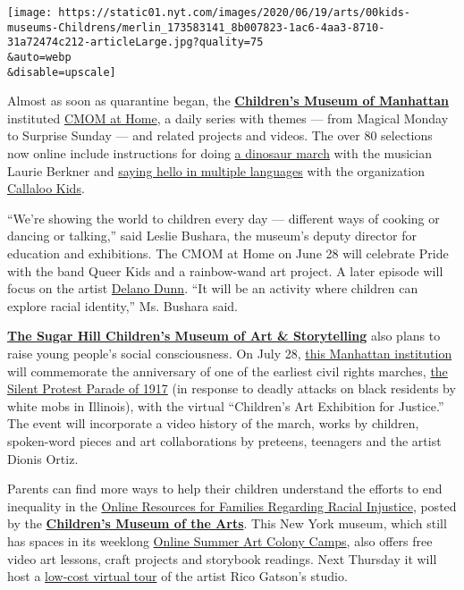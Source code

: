 \texttt{[image: https://static01.nyt.com/images/2020/06/19/arts/00kids-museums-Childrens/merlin\_173583141\_8b007823-1ac6-4aa3-8710-31a72474c212-articleLarge.jpg?quality=75\\\&auto=webp\\\&disable=upscale]}

Almost as soon as quarantine began, the
\textbf{\href{https://cmom.org/}{Children's Museum of Manhattan}}
instituted \href{https://athome.cmom.org/}{CMOM at Home}, a daily series
with themes --- from Magical Monday to Surprise Sunday --- and related
projects and videos. The over 80 selections now online include
instructions for doing
\href{https://athome.cmom.org/join-the-dinosaur-march-with-laurie-berkner/}{a
dinosaur march} with the musician Laurie Berkner and
\href{https://athome.cmom.org/ways-to-say-hello-with-mumu-fresh-and-callaloo-kids/}{saying
hello in multiple languages} with the organization
\href{http://www.callalookids.com/}{Callaloo Kids}.

``We're showing the world to children every day --- different ways of
cooking or dancing or talking,'' said Leslie Bushara, the museum's
deputy director for education and exhibitions. The CMOM at Home on June
28 will celebrate Pride with the band Queer Kids and a rainbow-wand art
project. A later episode will focus on the artist
\href{https://www.youtube.com/watch?v=A90E3QuF0Hw}{Delano Dunn}. ``It
will be an activity where children can explore racial identity,'' Ms.
Bushara said.

\textbf{\href{https://www.sugarhillmuseum.org/}{The Sugar Hill
Children's Museum of Art \& Storytelling}} also plans to raise young
people's social consciousness. On July 28,
\href{https://www.nytimes.com/2018/10/25/arts/design/sugar-hill-museum-art-to-new-yorks-youngest.html}{this
Manhattan institution} will commemorate the anniversary of one of the
earliest civil rights marches,
\href{https://naacp.org/silent-protest-parade-centennial/}{the Silent
Protest Parade of 1917} (in response to deadly attacks on black
residents by white mobs in Illinois), with the virtual ``Children's Art
Exhibition for Justice.'' The event will incorporate a video history of
the march, works by children, spoken-word pieces and art collaborations
by preteens, teenagers and the artist Dionis Ortiz.

Parents can find more ways to help their children understand the efforts
to end inequality in the
\href{https://cmany.org/blog/view/online-resources-families-regarding-racial-injustice/}{Online
Resources for Families Regarding Racial Injustice}, posted by the
\textbf{\href{https://cmany.org/}{Children's Museum of the Arts}}. This
New York museum, which still has spaces in its weeklong
\href{https://cmany.org/classes-and-activities/art-colony/summer-103-charlton/}{Online
Summer Art Colony Camps}, also offers free video art lessons, craft
projects and storybook readings. Next Thursday it will host a
\href{https://cmany.org/classes-and-activities/events/rico-gatson-virtual-studio-tour/}{low-cost
virtual tour} of the artist Rico Gatson's studio.


